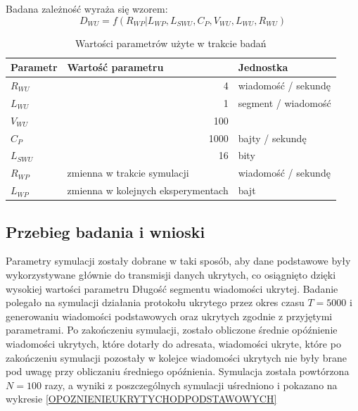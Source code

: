 \documentclass[a4paper, twoside, 12pt]{report}
\begin{document}
            Badana zależność wyraża się wzorem: \\
                $$ D_{WU} = f(R_{WP} | L_{WP}, L_{SWU}, C_P, V_{WU}, L_{WU}, R_{WU}) $$
            \begin{table}[h]
                \centering
                \begin{tabular}{ | l | r | l | }
                    \hline
                    {\bfseries Parametr} & \multicolumn{1}{|l|}{{\bfseries Wartość parametru}} & {\bfseries Jednostka} \\ \hline
                    \( R_{WU} \) & 4 & wiadomość / sekundę \\ \hline
                    \( L_{WU} \) & 1 & segment / wiadomość \\ \hline
                    \( V_{WU} \) & 100 & \\ \hline
                    \( C_P \) & 1000 & bajty / sekundę \\ \hline
                    \( L_{SWU} \) & 16 & bity \\ \hline
                    \( R_{WP} \) & \multicolumn{1}{|l|}{zmienna w trakcie symulacji} & wiadomość / sekundę \\ \hline
                    \( L_{WP} \) & zmienna w kolejnych eksperymentach & bajt \\ \hline
                \end{tabular}
                \caption{Wartości parametrów użyte w trakcie badań}
            \end{table}
        \subsection{Przebieg badania i wnioski}
            Parametry symulacji zostały dobrane w taki sposób, aby dane podstawowe
            były wykorzystywane głównie do transmisji danych ukrytych, co osiągnięto
            dzięki wysokiej wartości parametru Długość segmentu wiadomości ukrytej.
            Badanie polegało na symulacji działania protokołu ukrytego przez okres czasu
            \( T = 5000 \) i generowaniu wiadomości podstawowych oraz ukrytych zgodnie
            z przyjętymi parametrami. Po zakończeniu symulacji, zostało obliczone
            średnie opóźnienie wiadomości ukrytych, które dotarły do adresata, wiadomości
            ukryte, które po zakończeniu symulacji pozostały w kolejce wiadomości
            ukrytych nie były brane pod uwagę przy obliczaniu średniego opóźnienia.
            Symulacja została powtórzona \( N = 100 \) razy, a wyniki z poszczególnych
            symulacji uśredniono i pokazano na wykresie \ref{OPOZNIENIEUKRYTYCHODPODSTAWOWYCH}
\end{document}
